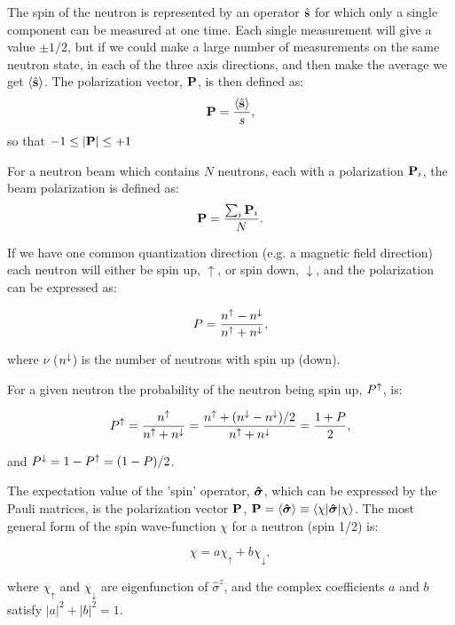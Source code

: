 The spin of the neutron is represented by an operator $\hat{\mathbf{s}}$ for which only a
single component can be measured at one time. Each single measurement will
give a value $\pm 1/2$, but if we could make a large number of measurements on
the same neutron state, in each of the three axis directions, and then make
the average we get $\langle \hat{\mathbf{s}} \rangle$. The polarization vector, $\mathbf{P}$, is
then defined as:
\begin{equation}
  \label{eq:pol_single}
  \mathbf{P} = \frac{\langle \hat{\mathbf{s}} \rangle}{s},
\end{equation}
so that $-1 \leq |\mathbf{P}| \leq +1$

For a neutron beam which contains $N$ neutrons, each with a
polarization $\mathbf{P}_i$, the beam polarization is defined as:
\begin{equation}
  \label{eq:pol_beam}
  \mathbf{P} = \frac{\sum_i \mathbf{P}_i}{N}.
\end{equation}

If we have one common quantization direction (e.g. a magnetic field
direction) each neutron will either be spin up, $\uparrow$, or spin down,
$\downarrow$, and the polarization can be expressed as:

\begin{equation}
  \label{eq:pol}
  P = \frac{n^\uparrow-n^\downarrow}{n^\uparrow+n^\downarrow},
\end{equation}

where $\nu$ ($n^\downarrow$) is the number of neutrons with spin up
(down).

For a given neutron the probability of the neutron being spin up, $P^\uparrow$, is:

\begin{equation}
  \label{eq:prob_spinup}
  P^\uparrow = \frac{n^\uparrow}{n^\uparrow+n^\downarrow} = \frac{n^\uparrow + (n^\downarrow-n^\downarrow)/2}{n^\uparrow+n^\downarrow}
  = \frac{1+P}{2},
\end{equation}

and $P^\downarrow = 1-P^\uparrow = (1-P)/2$.

The expectation value of the 'spin' operator, $\boldsymbol{\hat\sigma}$, which can be
expressed by the Pauli matrices, is the polarization vector $\mathbf{P}$, $\mathbf{P} =
\langle \boldsymbol{\hat\sigma} \rangle \equiv \langle \chi | \boldsymbol{\hat\sigma} | \chi \rangle$.  The
most general form of the spin wave-function $\chi$ for a neutron (spin 1/2)
is:

\begin{equation}
  \label{eq:neutron_wave}
  \chi = a\chi_\uparrow + b\chi_\downarrow,
\end{equation}

where $\chi_\uparrow$ and $\chi_\downarrow$ are eigenfunction of
$\hat{\sigma}^z$, and the complex coefficients $a$ and $b$ satisfy
$|a|^2 + |b|^2 = 1$.

